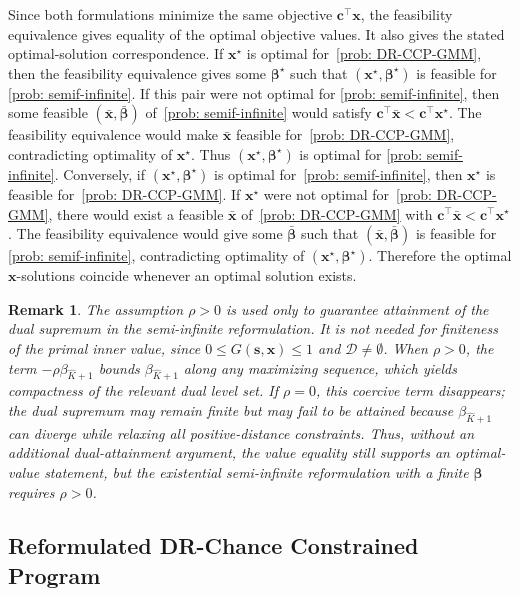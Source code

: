 \documentclass[opre,sglanonrev]{informs4}
\newtheorem{remark}{Remark}
\newcommand{\mD}{\mathcal{D}}
\newcommand{\bbeta}{\bm{\beta}}
\newcommand{\bc}{\bm{c}}
\newcommand{\bs}{\bm{s}}
\newcommand{\bx}{\bm{x}}
\begin{document}
{\begin{APPENDICES}
Since both formulations minimize the same objective \(\bc^\top\bx\), the
feasibility equivalence gives equality of the optimal objective values. It also
gives the stated optimal-solution correspondence. If \(\bx^\star\) is optimal
for~\eqref{prob: DR-CCP-GMM}, then the feasibility equivalence gives some
\(\bbeta^\star\) such that \((\bx^\star,\bbeta^\star)\) is feasible for
\eqref{prob: semif-infinite}. If this pair were not optimal for
\eqref{prob: semif-infinite}, then some feasible
\((\bar{\bx},\bar{\bbeta})\) of~\eqref{prob: semif-infinite} would satisfy
\(\bc^\top\bar{\bx}<\bc^\top\bx^\star\). The feasibility equivalence would make
\(\bar{\bx}\) feasible for~\eqref{prob: DR-CCP-GMM}, contradicting optimality
of \(\bx^\star\). Thus \((\bx^\star,\bbeta^\star)\) is optimal for
\eqref{prob: semif-infinite}. Conversely, if
\((\bx^\star,\bbeta^\star)\) is optimal for~\eqref{prob: semif-infinite}, then
\(\bx^\star\) is feasible for~\eqref{prob: DR-CCP-GMM}. If \(\bx^\star\) were
not optimal for~\eqref{prob: DR-CCP-GMM}, there would exist a feasible
\(\bar{\bx}\) of~\eqref{prob: DR-CCP-GMM} with
\(\bc^\top\bar{\bx}<\bc^\top\bx^\star\). The feasibility equivalence would give
some \(\bar{\bbeta}\) such that \((\bar{\bx},\bar{\bbeta})\) is feasible for
\eqref{prob: semif-infinite}, contradicting optimality of
\((\bx^\star,\bbeta^\star)\). Therefore the optimal \(\bx\)-solutions coincide
whenever an optimal solution exists. \hfill \qedsymbol

\begin{remark}
    The assumption \(\rho>0\) is used only to guarantee attainment of the dual
supremum in the semi-infinite reformulation. It is not needed for finiteness of
the primal inner value, since \(0\le G(\bs,\bx)\le1\) and \(\mD\neq\emptyset\).
When \(\rho>0\), the term \(-\rho\beta_{\hat K+1}\) bounds
\(\beta_{\hat K+1}\) along any maximizing sequence, which yields compactness of
the relevant dual level set. If \(\rho=0\), this coercive term disappears; the
dual supremum may remain finite but may fail to be attained because
\(\beta_{\hat K+1}\) can diverge while relaxing all positive-distance
constraints. Thus, without an additional dual-attainment argument, the value
equality still supports an optimal-value statement, but the existential
semi-infinite reformulation with a finite \(\bbeta\) requires \(\rho>0\).
\end{remark}
\subsection{Reformulated DR-Chance Constrained Program}\label{appndx:cut-alg-proof}



\end{APPENDICES}}
\end{document}
